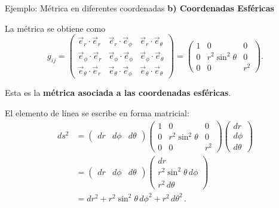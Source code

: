 \documentclass[../apunte_mecanica_clasica.tex]{subfiles}%
\begin{document}
\begin{apuntebloque}{Ejemplo: Métrica en diferentes coordenadas}
\textbf{b) Coordenadas Esféricas}

La métrica se obtiene como
\begin{equation*}
    g_{ij} =
    \begin{pmatrix}
        \vec{e}_r\!\cdot\!\vec{e}_r & \vec{e}_r\!\cdot\!\vec{e}_\phi & \vec{e}_r\!\cdot\!\vec{e}_\theta \\
        \vec{e}_\phi\!\cdot\!\vec{e}_r & \vec{e}_\phi\!\cdot\!\vec{e}_\phi & \vec{e}_\phi\!\cdot\!\vec{e}_\theta \\
        \vec{e}_\theta\!\cdot\!\vec{e}_r & \vec{e}_\theta\!\cdot\!\vec{e}_\phi & \vec{e}_\theta\!\cdot\!\vec{e}_\theta
    \end{pmatrix}
    =
    \begin{pmatrix}
        1 & 0 & 0 \\
        0 & r^2\sin^2\theta & 0 \\
        0 & 0 & r^2
    \end{pmatrix}.
\end{equation*}

Esta es la \textbf{métrica asociada a las coordenadas esféricas}.  

El elemento de línea se escribe en forma matricial:
\begin{align*}
    ds^2 &=
    \begin{pmatrix}
        dr & d\phi & d\theta
    \end{pmatrix}
    \begin{pmatrix}
        1 & 0 & 0 \\
        0 & r^2\sin^2\theta & 0 \\
        0 & 0 & r^2
    \end{pmatrix}
    \begin{pmatrix}
        dr \\ d\phi \\ d\theta
    \end{pmatrix} \\[4pt]
    &= 
    \begin{pmatrix}
        dr & d\phi & d\theta
    \end{pmatrix}
    \begin{pmatrix}
        dr \\ r^2\sin^2\theta\,d\phi \\ r^2\,d\theta
    \end{pmatrix} \\[4pt]
    &= dr^2 + r^2\sin^2\theta\,d\phi^2 + r^2\,d\theta^2 \,.
\end{align*}

\bigskip

\end{apuntebloque}
\end{document}
